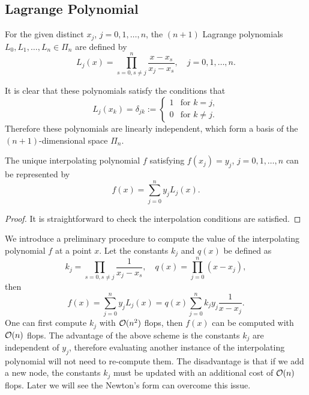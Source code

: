 \subsection{Lagrange Polynomial}
\begin{definition}
    For the given distinct $x_j$, $j = 0, 1, \dots, n$, the $(n+1)$ Lagrange polynomials $L_0, L_1,\dots, L_n\in\Pi_n$ are defined by 
    \begin{equation}
        L_j(x) = \prod_{s = 0, s\neq j}^n \frac{x - x_s}{x_j - x_s}, \quad j = 0, 1,\dots , n.
    \end{equation}
\end{definition}
It is clear that these polynomials satisfy the conditions that 
\begin{equation}
    L_j(x_k) = \delta_{jk} := \begin{cases}
        1&\text{for } k=j,\\
        0&\text{for } k\neq j.
    \end{cases}
\end{equation}
Therefore these polynomials are linearly independent, which form a basis of the $(n+ 1)$-dimensional space $\Pi_n$.
\begin{theorem}
\label{Thm: 2-Uni-Exi-Lag}
    The unique interpolating polynomial $f$ satisfying $f(x_j) = y_j$, $j=0,1,\dots, n$ can be represented by 
    \begin{equation}
        f(x) = \sum_{j=0}^n y_j L_j(x).
    \end{equation}
\end{theorem}
\begin{proof}
    It is straightforward to check the interpolation conditions are satisfied.
\end{proof}
\begin{remark}
    We introduce a preliminary procedure to compute the value of the interpolating polynomial $f$ at a point $x$. Let the constants $k_j$ and $q(x)$ be defined as 
    \begin{equation}
        k_j = \prod_{s= 0, s\neq j}\frac{1}{x_j - x_s},\quad q(x) = \prod_{j=0}^n (x - x_j),
    \end{equation}
    then 
    \begin{equation}
        f(x) = \sum_{j=0}^n y_j L_j(x) = q(x)  \sum_{j=0}^n k_j y_j \frac{1}{x - x_j}.
    \end{equation}
    One can first compute $k_j$ with $\mathcal O(n^2)$ flops, then $f(x)$ can be computed with $\mathcal O(n)$ flops. The advantage of the above scheme is the constants $k_j$ are independent of $y_j$, therefore evaluating another instance of the interpolating polynomial will not need to re-compute them. The disadvantage is that if we add a new node, the constants $k_j$ must be updated with an additional cost of $\mathcal O(n)$ flops. Later we will see the Newton's form can overcome this issue.
\end{remark}
